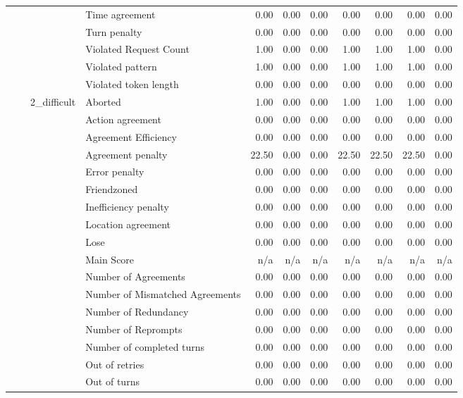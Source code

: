 \begin{tabular}{llllrrrrrrr}
 &  &  & Time agreement & 0.00 & 0.00 & 0.00 & 0.00 & 0.00 & 0.00 & 0.00 \\
 &  &  & Turn penalty & 0.00 & 0.00 & 0.00 & 0.00 & 0.00 & 0.00 & 0.00 \\
 &  &  & Violated Request Count & 1.00 & 0.00 & 0.00 & 1.00 & 1.00 & 1.00 & 0.00 \\
 &  &  & Violated pattern & 1.00 & 0.00 & 0.00 & 1.00 & 1.00 & 1.00 & 0.00 \\
 &  &  & Violated token length & 0.00 & 0.00 & 0.00 & 0.00 & 0.00 & 0.00 & 0.00 \\
\cline{3-11}
 &  & \multirow[t]{27}{*}{2_difficult} & Aborted & 1.00 & 0.00 & 0.00 & 1.00 & 1.00 & 1.00 & 0.00 \\
 &  &  & Action agreement & 0.00 & 0.00 & 0.00 & 0.00 & 0.00 & 0.00 & 0.00 \\
 &  &  & Agreement Efficiency & 0.00 & 0.00 & 0.00 & 0.00 & 0.00 & 0.00 & 0.00 \\
 &  &  & Agreement penalty & 22.50 & 0.00 & 0.00 & 22.50 & 22.50 & 22.50 & 0.00 \\
 &  &  & Error penalty & 0.00 & 0.00 & 0.00 & 0.00 & 0.00 & 0.00 & 0.00 \\
 &  &  & Friendzoned & 0.00 & 0.00 & 0.00 & 0.00 & 0.00 & 0.00 & 0.00 \\
 &  &  & Inefficiency penalty & 0.00 & 0.00 & 0.00 & 0.00 & 0.00 & 0.00 & 0.00 \\
 &  &  & Location agreement & 0.00 & 0.00 & 0.00 & 0.00 & 0.00 & 0.00 & 0.00 \\
 &  &  & Lose & 0.00 & 0.00 & 0.00 & 0.00 & 0.00 & 0.00 & 0.00 \\
 &  &  & Main Score & n/a & n/a & n/a & n/a & n/a & n/a & n/a \\
 &  &  & Number of Agreements & 0.00 & 0.00 & 0.00 & 0.00 & 0.00 & 0.00 & 0.00 \\
 &  &  & Number of Mismatched Agreements & 0.00 & 0.00 & 0.00 & 0.00 & 0.00 & 0.00 & 0.00 \\
 &  &  & Number of Redundancy & 0.00 & 0.00 & 0.00 & 0.00 & 0.00 & 0.00 & 0.00 \\
 &  &  & Number of Reprompts & 0.00 & 0.00 & 0.00 & 0.00 & 0.00 & 0.00 & 0.00 \\
 &  &  & Number of completed turns & 0.00 & 0.00 & 0.00 & 0.00 & 0.00 & 0.00 & 0.00 \\
 &  &  & Out of retries & 0.00 & 0.00 & 0.00 & 0.00 & 0.00 & 0.00 & 0.00 \\
 &  &  & Out of turns & 0.00 & 0.00 & 0.00 & 0.00 & 0.00 & 0.00 & 0.00 \\

\end{tabular}
